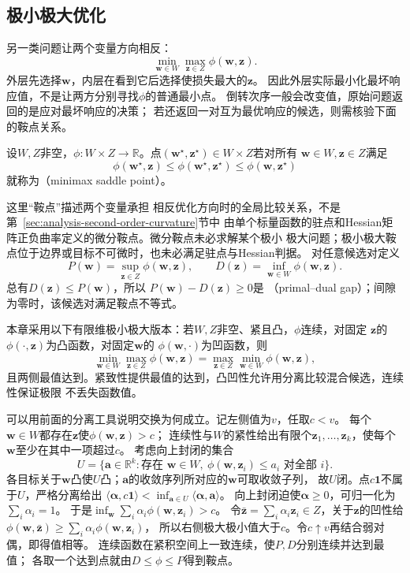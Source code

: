 \subsection{极小极大优化}
\label{sec:opt-minimax}

另一类问题让两个变量方向相反：
\[
  \min_{\bm{w}\in W}\max_{\bm{z}\in Z}\phi(\bm{w},\bm{z}).
\]
外层先选择$\bm w$，内层在看到它后选择使损失最大的$\bm z$。
因此外层实际最小化最坏响应值，不是让两方分别寻找$\phi$的普通最小点。
倒转次序一般会改变值，原始问题返回的是应对最坏响应的决策；
若还返回一对互为最优响应的候选，则需核验下面的鞍点关系。
\begin{definition}[极小极大鞍点]
\label{def:opt-minimax-saddle}
设$W,Z$非空，$\phi:W\times Z\to\mathbb R$。点$(\bm w^\star,\bm z^\star)\in W\times Z$若对所有
$\bm w\in W,\bm z\in Z$满足
\[
  \phi(\bm{w}^{\star},\bm{z})
  \leq\phi(\bm{w}^{\star},\bm{z}^{\star})
  \leq\phi(\bm{w},\bm{z}^{\star})
\]
就称为（minimax saddle point）。
\end{definition}
这里“鞍点”描述两个变量承担
相反优化方向时的全局比较关系，不是第~\ref{sec:analysis-second-order-curvature}节中
由单个标量函数的驻点和Hessian矩阵正负曲率定义的微分鞍点。微分鞍点未必求解某个极小
极大问题；极小极大鞍点位于边界或目标不可微时，也未必满足驻点与Hessian判据。
对任意候选对定义
\[
  P(\bm{w})=\sup_{\bm{z}\in Z}\phi(\bm{w},\bm{z}),\qquad
  D(\bm{z})=\inf_{\bm{w}\in W}\phi(\bm{w},\bm{z}).
\]
总有$D(\bm{z})\leq P(\bm{w})$，所以
$P(\bm{w})-D(\bm{z})\geq0$是
（primal--dual gap）；间隙为零时，该候选对满足鞍点不等式。

本章采用以下有限维极小极大版本：若$W,Z$非空、紧且凸，$\phi$连续，对固定
$\bm{z}$的$\phi(\cdot,\bm{z})$为凸函数，对固定$\bm{w}$的
$\phi(\bm{w},\cdot)$为凹函数，则
\[
  \min_{\bm{w}\in W}\max_{\bm{z}\in Z}\phi(\bm{w},\bm{z})
  =
  \max_{\bm{z}\in Z}\min_{\bm{w}\in W}\phi(\bm{w},\bm{z}),
\]
且两侧最值达到。紧致性提供最值的达到，凸凹性允许用分离比较混合候选，连续性保证极限
不丢失函数值。

可以用前面的分离工具说明交换为何成立。记左侧值为$v$，任取$c<v$。
每个$\bm w\in W$都存在$\bm z$使$\phi(\bm w,\bm z)>c$；
连续性与$W$的紧性给出有限个$\bm z_1,\ldots,\bm z_k$，使每个$\bm w$至少在其中一项超过$c$。
考虑向上封闭的集合
\[
 U=\{\bm a\in\mathbb R^k:\text{存在 }\bm w\in W,\
          \phi(\bm w,\bm z_i)\leq a_i\text{ 对全部 }i\}.
\]
各目标关于$\bm w$凸使$U$凸；$\bm a$的收敛序列所对应的$\bm w$可取收敛子列，
故$U$闭。点$c\bm1$不属于$U$，严格分离给出
$\langle\bm\alpha,c\bm1\rangle<
\inf_{\bm a\in U}\langle\bm\alpha,\bm a\rangle$。
向上封闭迫使$\bm\alpha\geq0$，可归一化为$\sum_i\alpha_i=1$。
于是$\inf_{\bm w}\sum_i\alpha_i\phi(\bm w,\bm z_i)>c$。
令$\bar{\bm z}=\sum_i\alpha_i\bm z_i\in Z$，关于$\bm z$的凹性给
$\phi(\bm w,\bar{\bm z})\geq\sum_i\alpha_i\phi(\bm w,\bm z_i)$，
所以右侧极大极小值大于$c$。令$c\uparrow v$再结合弱对偶，即得值相等。
连续函数在紧积空间上一致连续，使$P,D$分别连续并达到最值；
各取一个达到点就由$D\leq\phi\leq P$得到鞍点。


